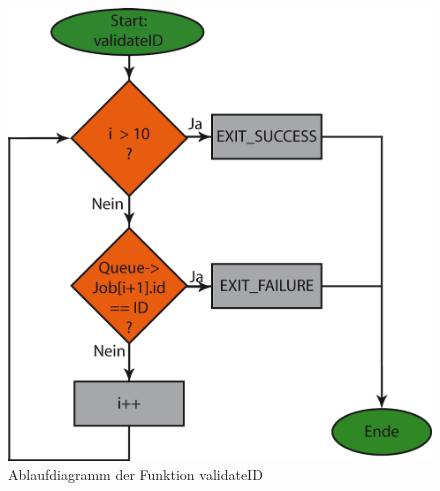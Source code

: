 \begin{figure}[h]
\includegraphics[scale = 0.8]{./validateID.png}
\hspace{-14pt}
\caption{Ablaufdiagramm der Funktion validateID}
\end{figure} 

